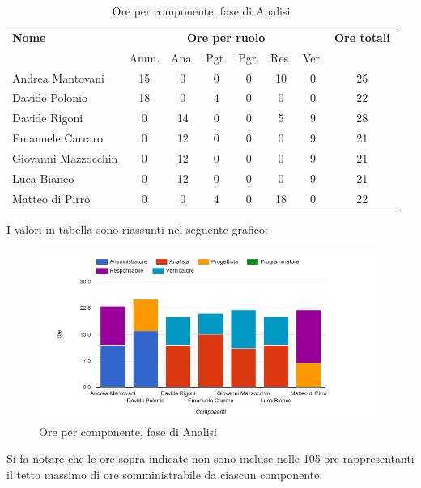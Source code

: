 \begin{table}[H]
\begin{tabular}{lccccccc}
\toprule
    \textbf{Nome}  & \multicolumn{6}{c}{\textbf{Ore per ruolo}} & \textbf{Ore totali} \\
     & Amm. & Ana. & Pgt. & Pgr. & Res. & Ver. & \\
    \midrule
    
	   Andrea Mantovani & 15 & 0 & 0 & 0 & 10 & 0 & 25 \\
	     Davide Polonio & 18 & 0 & 4 & 0 & 0 & 0 & 22 \\
	      Davide Rigoni & 0 & 14 & 0 & 0 & 5 & 9 & 28 \\
	   Emanuele Carraro & 0 & 12 & 0 & 0 & 0 & 9 & 21 \\
	Giovanni Mazzocchin & 0 & 12 & 0 & 0 & 0 & 9 & 21 \\
	        Luca Bianco & 0 & 12 & 0 & 0 & 0 & 9 & 21 \\
	    Matteo di Pirro & 0 & 0 & 4 & 0 & 18 & 0 & 22 \\
    
    \bottomrule
\end{tabular}
\caption{Ore per componente, fase di Analisi}
\end{table}


I valori in tabella sono riassunti nel seguente grafico: \\ 

    \begin{figure}[H]
      \begin{center}
        \includegraphics[width=12cm]{res/img/orePerComponenteAnalisi.png}
      \caption{Ore per componente, fase di Analisi}
      \end{center} 
    \end{figure}    
    
Si fa notare che le ore sopra indicate non sono incluse nelle 105 ore rappresentanti il tetto massimo di ore somministrabile da ciascun componente.


